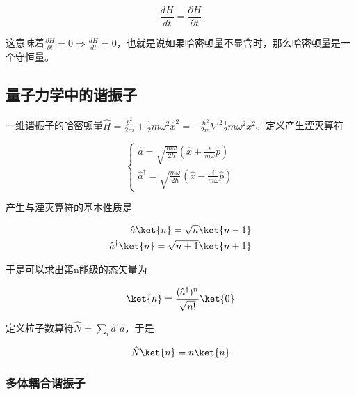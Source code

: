 \begin{equation}
    \frac{d H}{dt}=\frac{\partial H}{\partial t}
\end{equation}

这意味着$\frac{\partial H}{\partial t}=0\Rightarrow\frac{dH}{dt}=0$，也就是说如果哈密顿量不显含时，那么哈密顿量是一个守恒量。



\subsection{量子力学中的谐振子}

一维谐振子的哈密顿量$\hat{H}=\frac{\hat{p}^2}{2m}+\frac{1}{2}m\omega^2\hat{x}^2=-\frac{\hbar^2}{2m}\nabla^2\frac{1}{2}m\omega^2x^2$。定义产生湮灭算符

\begin{equation}
    \left\{
        \begin{array}{lr}
            \hat{a}=\sqrt{\frac{m\omega}{2\hbar}}(\hat{x}+\frac{i}{m\omega}\hat{p})   \\
            \hat{a}^\dagger=\sqrt{\frac{m\omega}{2\hbar}}(\hat{x}-\frac{i}{m\omega}\hat{p})
        \end{array}
    \right.
\end{equation}

产生与湮灭算符的基本性质是

\begin{equation}
    \begin{split}
        \hat{a}\ket{n}=\sqrt{n}\ket{n-1} \\
        \hat{a}^\dagger\ket{n}=\sqrt{n+1}\ket{n+1}
    \end{split}
\end{equation}

于是可以求出第n能级的态矢量为

\begin{equation}
    \ket{n}=\frac{(\hat{a}^\dagger)^n}{\sqrt{n!}}\ket{0}
\end{equation}

定义粒子数算符$\hat{N}=\sum_{i}\hat{a}^\dagger\hat{a}$，于是

\begin{equation}
    \hat{N}\ket{n}=n\ket{n}
\end{equation}

\subsubsection{多体耦合谐振子}

